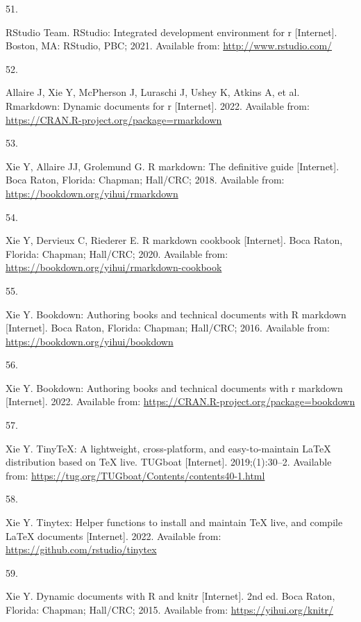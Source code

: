 \documentclass[10pt,a4paper]{article}
\newlength{\cslhangindent}
\newlength{\csllabelwidth}
\newlength{\cslentryspacingunit} %
\newenvironment{CSLReferences}[2] %
 {%
  \setlength{\parindent}{0pt}
  \ifodd #1
  \let\oldpar\par
  \def\par{\hangindent=\cslhangindent\oldpar}
  \fi
  \setlength{\parskip}{#2\cslentryspacingunit}
 }%
 {}
\newcommand{\CSLLeftMargin}[1]{\parbox[t]{\csllabelwidth}{#1}}
\newcommand{\CSLRightInline}[1]{\parbox[t]{\linewidth - \csllabelwidth}{#1}\break}
\begin{document}
\begin{CSLReferences}{0}{0}
\leavevmode{}%
\CSLLeftMargin{51. }
\CSLRightInline{RStudio Team. RStudio: Integrated development environment for r {[}Internet{]}. Boston, MA: RStudio, PBC; 2021. Available from: \url{http://www.rstudio.com/}}

\leavevmode{}%
\CSLLeftMargin{52. }
\CSLRightInline{Allaire J, Xie Y, McPherson J, Luraschi J, Ushey K, Atkins A, et al. Rmarkdown: Dynamic documents for r {[}Internet{]}. 2022. Available from: \url{https://CRAN.R-project.org/package=rmarkdown}}

\leavevmode{}%
\CSLLeftMargin{53. }
\CSLRightInline{Xie Y, Allaire JJ, Grolemund G. R markdown: The definitive guide {[}Internet{]}. Boca Raton, Florida: Chapman; Hall/CRC; 2018. Available from: \url{https://bookdown.org/yihui/rmarkdown}}

\leavevmode{}%
\CSLLeftMargin{54. }
\CSLRightInline{Xie Y, Dervieux C, Riederer E. R markdown cookbook {[}Internet{]}. Boca Raton, Florida: Chapman; Hall/CRC; 2020. Available from: \url{https://bookdown.org/yihui/rmarkdown-cookbook}}

\leavevmode{}%
\CSLLeftMargin{55. }
\CSLRightInline{Xie Y. Bookdown: Authoring books and technical documents with {R} markdown {[}Internet{]}. Boca Raton, Florida: Chapman; Hall/CRC; 2016. Available from: \url{https://bookdown.org/yihui/bookdown}}

\leavevmode{}%
\CSLLeftMargin{56. }
\CSLRightInline{Xie Y. Bookdown: Authoring books and technical documents with r markdown {[}Internet{]}. 2022. Available from: \url{https://CRAN.R-project.org/package=bookdown}}

\leavevmode{}%
\CSLLeftMargin{57. }
\CSLRightInline{Xie Y. TinyTeX: A lightweight, cross-platform, and easy-to-maintain LaTeX distribution based on TeX live. TUGboat {[}Internet{]}. 2019;(1):30--2. Available from: \url{https://tug.org/TUGboat/Contents/contents40-1.html}}

\leavevmode{}%
\CSLLeftMargin{58. }
\CSLRightInline{Xie Y. Tinytex: Helper functions to install and maintain TeX live, and compile LaTeX documents {[}Internet{]}. 2022. Available from: \url{https://github.com/rstudio/tinytex}}

\leavevmode{}%
\CSLLeftMargin{59. }
\CSLRightInline{Xie Y. Dynamic documents with {R} and knitr {[}Internet{]}. 2nd ed. Boca Raton, Florida: Chapman; Hall/CRC; 2015. Available from: \url{https://yihui.org/knitr/}}


\end{CSLReferences}
\end{document}
